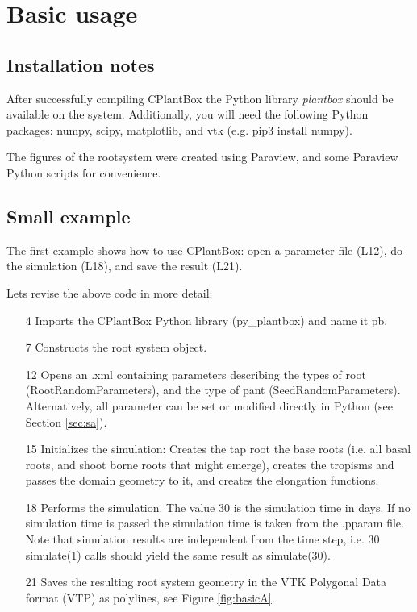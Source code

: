 \section{Basic usage}

\subsection{Installation notes}

After successfully compiling CPlantBox the Python library \emph{plantbox} should be available on the system. 
Additionally, you will need the following Python packages: numpy, scipy, matplotlib, and vtk (e.g. pip3 install numpy). 

The figures of the rootsystem were created using Paraview, and some Paraview Python scripts for convenience.

\subsection{Small example}

The first example shows how to use CPlantBox: open a parameter file (L12), do the simulation (L18), and save the result (L21). 


\noindent 
Lets revise the above code in more detail: 
\begin{itemize}
 \item[4] Imports the CPlantBox Python library (py\_plantbox) and name it pb.
 \item[7] Constructs the root system object.
 \item[12] Opens an .xml containing parameters describing the types of root (RootRandomParameters), and the type of pant (SeedRandomParameters). Alternatively, all parameter can be set or modified directly in Python (see Section \ref{sec:sa}).
 \item[15] Initializes the simulation: Creates the tap root the base roots (i.e. all basal roots, and shoot borne roots that might emerge), creates the tropisms and passes the domain geometry to it, and creates the elongation functions. 
 \item[18] Performs the simulation. The value 30 is the simulation time in days. If no simulation time is passed the simulation time is taken from the .pparam file. Note that simulation results are independent from the time step, i.e. 30 simulate(1) calls should yield the same result as simulate(30). 
 \item[21] Saves the resulting root system geometry in the VTK Polygonal Data format (VTP) as polylines, see Figure \ref{fig:basicA}. 
\end{itemize}

